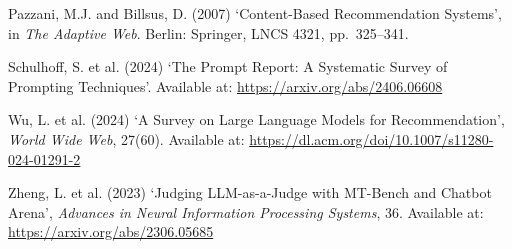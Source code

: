 \begin{description}
\item Pazzani, M.J. and Billsus, D. (2007) `Content-Based Recommendation Systems', in \textit{The Adaptive Web}. Berlin: Springer, LNCS 4321, pp.\ 325--341.

\item Schulhoff, S. et al. (2024) `The Prompt Report: A Systematic Survey of Prompting Techniques'. Available at: \url{https://arxiv.org/abs/2406.06608}

\item Wu, L. et al. (2024) `A Survey on Large Language Models for Recommendation', \textit{World Wide Web}, 27(60). Available at: \url{https://dl.acm.org/doi/10.1007/s11280-024-01291-2}

\item Zheng, L. et al. (2023) `Judging LLM-as-a-Judge with MT-Bench and Chatbot Arena', \textit{Advances in Neural Information Processing Systems}, 36. Available at: \url{https://arxiv.org/abs/2306.05685}

\end{description}
